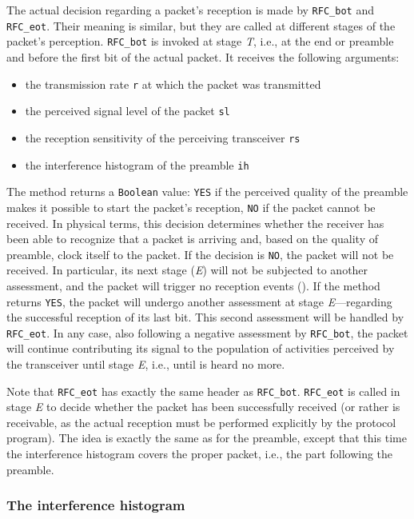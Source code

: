 The actual decision regarding a packet's reception is made by
{\tt RFC\_bot} and {\tt RFC\_eot}.
Their meaning is similar, but they are called at different stages of the
packet's perception.
{\tt RFC\_bot} is invoked at stage {\em T}, i.e., at the end or preamble and
before the first bit of the actual packet.
It receives the following arguments:
\begin{itemize}
\item
the transmission rate {\tt r} at which the packet was transmitted
\item
the perceived signal level of the packet {\tt sl}
\item
the reception sensitivity of the perceiving transceiver {\tt rs}
\item
the interference histogram of the preamble {\tt ih}
\end{itemize}
\noindent
The method returns a {\tt Boolean} value: {\tt YES} if the
perceived quality of the preamble makes it possible to start the packet's
reception, {\tt NO} if the packet cannot be received.
In physical terms, this decision determines whether the receiver has been
able to recognize that a packet is arriving and, based on the quality of
preamble, clock itself to the packet.
If the decision is {\tt NO}, the packet will not be received.
In particular, its next stage ({\em E\/}) will not be subjected to another
assessment, and the packet will trigger no reception events
().
If the method returns {\tt YES}, the packet will undergo another
assessment at stage {\em E\/}---regarding the successful
reception of its last bit.
This second assessment will be handled by {\tt RFC\_eot}.
In any case, also following a negative assessment by {\tt RFC\_bot},
the packet will continue contributing its signal to the population of
activities perceived by the transceiver until stage {\em E}, i.e., until
is heard no more.

Note that {\tt RFC\_eot} has exactly
the same header as {\tt RFC\_bot}.
{\tt RFC\_eot} is called in stage {\em E\/} to decide whether the packet
has been successfully received (or rather is receivable, as the actual
reception must be performed explicitly by the protocol program).
The idea is exactly the same as for the preamble, except that this time
the interference histogram covers the proper packet, i.e., the part following
the preamble.

\subsubsection{The interference histogram}
\label{rm_tr_ra_ih}

